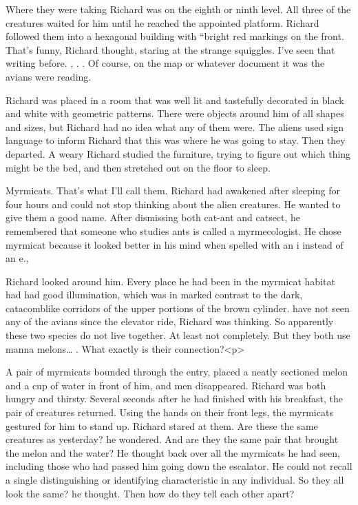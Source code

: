 \documentclass[]{article}
\begin{document}
{Where they were taking Richard was on the eighth or ninth level. All three of the creatures waited for him until he reached the appointed platform. Richard followed them into a hexagonal building with “bright red markings on the front. That’s funny, Richard thought, staring at the strange squiggles. I’ve seen that writing before. , . . Of course, on the map or whatever document it was the avians were reading.

Richard was placed in a room that was well lit and tastefully decorated in black and white with geometric patterns. There were objects around him of all shapes and sizes, but Richard had no idea what any of them were. The aliens used sign language to inform Richard that this was where he was going to stay. Then they departed. A weary Richard studied the furniture, trying to figure out which thing might be the bed, and then stretched out on the floor to sleep.

Myrmicats. That’s what I’ll call them. Richard had awakened after sleeping for four hours and could not stop thinking about the alien creatures. He wanted to give them a good name. After dismissing both cat-ant and catsect, he remembered that someone who studies ants is called a myrmecologist. He chose myrmicat because it looked better in his mind when spelled with an i instead of an e.,

Richard looked around him. Every place he had been in the myrmicat habitat had had good illumination, which was in marked contrast to the dark, catacomblike corridors of the upper portions of the brown cylinder. have not seen any of the avians since the elevator ride, Richard was thinking. So apparently these two species do not live together. At least not completely. But they both use manna melons… . What exactly is their connection?<p>

A pair of myrmicats bounded through the entry, placed a neatly sectioned melon and a cup of water in front of him, and men disappeared. Richard was both hungry and thirsty. Several seconds after he had finished with his breakfast, the pair of creatures returned. Using the hands on their front legs, the myrmicats gestured for him to stand up. Richard stared at them. Are these the same creatures as yesterday? he wondered. And are they the same pair that brought the melon and the water? He thought back over all the myrmicats he had seen, including those who had passed him going down the escalator. He could not recall a single distinguishing or identifying characteristic in any individual. So they all look the same? he thought. Then how do they tell each other apart?

}
\end{document}
